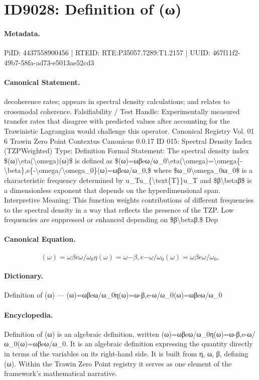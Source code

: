 \section*{ID9028: Definition of (ω)}
\paragraph{Metadata.}
PiID: 4437558900456 | RTEID: RTE:P35057.7289:T1.2157 | UUID: 467f11f2-49b7-58fa-ad73-e5013ae52cd3

\paragraph{Canonical Statement.}
decoherence rates; appears in spectral density calculations; and relates to crossmodal coherence. Falsifiability / Test Handle: Experimentally measured transfer rates that disagree with predicted values after accounting for the Trawinistic Lagrangian would challenge this operator. Canonical Registry Vol. 01 6 Trawin Zero Point Contextus Canonicus 0.0.17 ID 015: Spectral Density Index (TZPWeighted) Type: Definition Formal Statement: The spectral density index \$(ω)\textbackslash{}eta(\textbackslash{}omega)(ω)\$ is defined as \$(ω)=ωβeω/ω\_0\textbackslash{}eta(\textbackslash{}omega)=\textbackslash{}omega\{-\textbackslash{}beta\},e\{-\textbackslash{}omega/\textbackslash{}omega\_0\}(ω)=ωβeω/ω\_0,\$ where \$ω\_0\textbackslash{}omega\_0ω\_0\$ is a characteristic frequency determined by u\_Tu\_\{\textbackslash{}text\{T\}\}u\_T and \$β\textbackslash{}betaβ\$ is a dimensionless exponent that depends on the hyperdimensional span. Interpretive Meaning: This function weights contributions of different frequencies to the spectral density in a way that reflects the presence of the TZP. Low frequencies are suppressed or enhanced depending on \$β\textbackslash{}betaβ.\$ Dep

\paragraph{Canonical Equation.}
\[
(ω)=ωβeω/ω_0\eta(\omega)=\omega{-\beta},e{-\omega/\omega_0}(ω)=ωβeω/ω_0,
\]

\paragraph{Dictionary.}
Definition of (ω) — (ω)=ωβeω/ω\_0η(ω)=ω-β,e-ω/ω\_0(ω)=ωβeω/ω\_0

\paragraph{Encyclopedia.}
Definition of (ω) is an algebraic definition, written (ω)=ωβeω/ω\_0η(ω)=ω-β,e-ω/ω\_0(ω)=ωβeω/ω\_0. It is an algebraic definition expressing the quantity directly in terms of the variables on its right-hand side. It is built from η, ω, β, defining (ω). Within the Trawin Zero Point registry it serves as one element of the framework's mathematical narrative.
